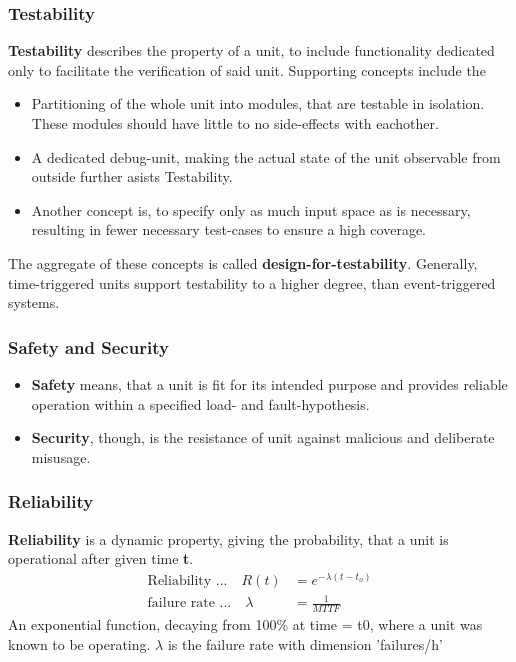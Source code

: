 \documentclass[master,english,smartquotes,apa]{hgbthesis}
\begin{document}
	\subsubsection{Testability}
	{\bf Testability} describes the property of a unit, to include functionality dedicated only to facilitate the verification of said unit. Supporting concepts include the \\
	\begin{itemize}
		\item Partitioning of the whole unit into modules, that are testable in isolation. These modules should have little to no side-effects with eachother. 
		\item A dedicated debug-unit, making the actual state of the unit observable from outside further asists Testability. 
		\item Another concept is, to specify only as much input space as is necessary, resulting in fewer necessary test-cases to ensure a high coverage.
	\end{itemize}

	The aggregate of these concepts is called {\bf design-for-testability}.
	Generally, time-triggered units support testability to a higher degree, than event-triggered systems.
	\subsubsection{Safety and Security}
	\begin{itemize}
		\item {\bf Safety} means, that a unit is fit for its intended purpose and provides reliable operation within a specified load- and fault-hypothesis.
		\item {\bf Security}, though, is the resistance of unit against malicious and deliberate misusage.
	\end{itemize}
	\subsubsection{Reliability}
	{\bf Reliability} is a dynamic property, giving the probability, that a unit is operational after given time {\bf t}.
		\begin{align*}
		\textrm{Reliability ...} \quad R(t) & = e^{-\lambda (t-t_o) }\\
		\textrm{failure rate ...}  \quad \lambda & = \frac{1}{MTTF} 
		\end{align*}
	An exponential function, decaying from 100\% at time = t0, where a unit was known to be operating. $\lambda$ is the failure rate with dimension 'failures/h'
	
\end{document}
